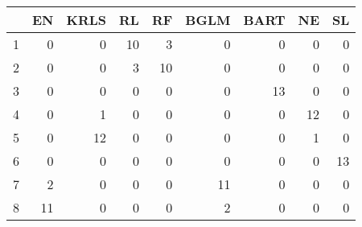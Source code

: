 \begin{table}[ht]
\centering
\begin{tabular}{rrrrrrrrr}
  \hline
 & EN & KRLS & RL & RF & BGLM & BART & NE & SL \\ 
  \hline
1 &   0 &   0 &  10 &   3 &   0 &   0 &   0 &   0 \\ 
  2 &   0 &   0 &   3 &  10 &   0 &   0 &   0 &   0 \\ 
  3 &   0 &   0 &   0 &   0 &   0 &  13 &   0 &   0 \\ 
  4 &   0 &   1 &   0 &   0 &   0 &   0 &  12 &   0 \\ 
  5 &   0 &  12 &   0 &   0 &   0 &   0 &   1 &   0 \\ 
  6 &   0 &   0 &   0 &   0 &   0 &   0 &   0 &  13 \\ 
  7 &   2 &   0 &   0 &   0 &  11 &   0 &   0 &   0 \\ 
  8 &  11 &   0 &   0 &   0 &   2 &   0 &   0 &   0 \\ 
   \hline
\end{tabular}
\end{table}
